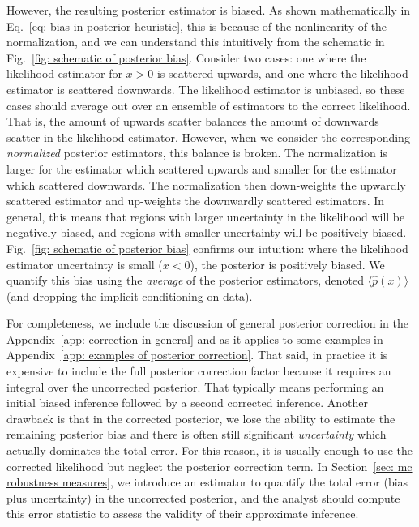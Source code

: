 However, the resulting posterior estimator is biased. As shown mathematically in Eq.~\ref{eq: bias in posterior heuristic}, this is because of the nonlinearity of the normalization, and we can understand this intuitively from the schematic in Fig.~\ref{fig: schematic of posterior bias}. Consider two cases: one where the likelihood estimator for $x>0$ is scattered upwards, and one where the likelihood estimator is scattered downwards. The likelihood estimator is unbiased, so these cases should average out over an ensemble of estimators to the correct likelihood. That is, the amount of upwards scatter balances the amount of downwards scatter in the likelihood estimator. However, when we consider the corresponding \textit{normalized} posterior estimators, this balance is broken. The normalization is larger for the estimator which scattered upwards and smaller for the estimator which scattered downwards. The normalization then down-weights the upwardly scattered estimator and up-weights the downwardly scattered estimators. In general, this means that regions with larger uncertainty in the likelihood will be negatively biased, and regions with smaller uncertainty will be positively biased. 
Fig.~\ref{fig: schematic of posterior bias} confirms our intuition: where the likelihood estimator uncertainty is small ($x<0$), the posterior is positively biased. We quantify this bias using the \textit{average} of the posterior estimators, denoted $\langle\hat{p}(x)\rangle$ (and dropping the implicit conditioning on data). 

For completeness, we include the discussion of general posterior correction in the Appendix~\ref{app: correction in general} and as it applies to some examples in Appendix~\ref{app: examples of posterior correction}. That said, in practice it is expensive to include the full posterior correction factor because it requires an integral over the uncorrected posterior. That typically means performing an initial biased inference followed by a second corrected inference. Another drawback is that in the corrected posterior, we lose the ability to estimate the remaining posterior bias and there is often still significant \textit{uncertainty} which actually dominates the total error. For this reason, it is usually enough to use the corrected likelihood but neglect the posterior correction term. In Section~\ref{sec: mc robustness measures}, we introduce an estimator to quantify the total error (bias plus uncertainty) in the uncorrected posterior, and the analyst should compute this error statistic to assess the validity of their approximate inference.


